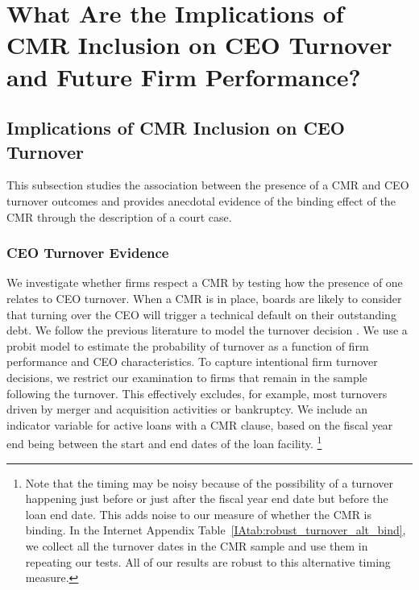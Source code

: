 \documentclass[a4paper,12pt]{article}
\begin{document}
\section{What Are the Implications of CMR Inclusion on CEO Turnover and Future Firm Performance?}
\label{section:turnover}

\subsection{Implications of CMR Inclusion on CEO Turnover}

This subsection studies the association between the presence of a CMR and CEO turnover outcomes and provides anecdotal evidence of the binding effect of the CMR through the description of a court case.

\subsubsection{CEO Turnover Evidence}

We investigate whether firms respect a CMR by testing how the presence of one relates to CEO turnover.
When a CMR is in place, boards are likely to consider that turning over the CEO will trigger a technical default on their outstanding debt. 
We follow the previous literature to model the turnover decision \citep{Parrino_1997, Kaplan_2012, Jenter_2015}.
We use a probit model to estimate the probability of turnover as a function of firm performance and CEO characteristics.
To capture intentional firm turnover decisions, we restrict our examination to firms that remain in the sample following the turnover. 
This effectively excludes, for example, most turnovers driven by merger and acquisition activities or bankruptcy.
We include an indicator variable for active loans with a CMR clause, based on the fiscal year end being between the start and end dates of the loan facility.%
    \footnote{Note that the timing may be noisy because of the possibility of a turnover happening just before or just after the fiscal year end date but before the loan end date. This adds noise to our measure of whether the CMR is binding. In the Internet Appendix Table~\ref{IAtab:robust_turnover_alt_bind}, we collect all the turnover dates in the CMR sample and use them in repeating our tests. All of our results are robust to this alternative timing measure.} 
\end{document}
